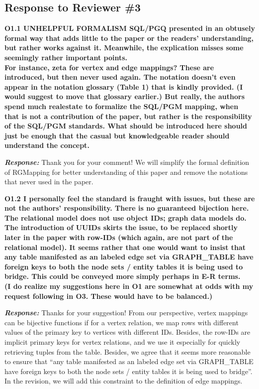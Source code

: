 \subsection{Response to Reviewer \#3}

\textbf{
O1.1 UNHELPFUL FORMALISM
SQL/PGQ presented in an obtusely formal way that adds little to the paper or the readers' understanding, but rather works against it. 
Meanwhile, the explication misses some seemingly rather important points. \\
For instance, zeta for vertex and edge mappings? These are introduced, but then never used again. The notation doesn't even appear in the notation glossary (Table 1) that is kindly provided. (I would suggest to move that glossary earlier.) But really, the authors spend much realestate to formalize the SQL/PGM mapping, when that is not a contribution of the paper, but rather is the responsibility of the SQL/PGM standards. What should be introduced here should just be enough that the casual but knowledgeable reader should understand the concept.}

\textbf{\textit{Response: }}
Thank you for your comment! We will simplify the formal definition of RGMapping for better understanding of this paper and remove the notations that never used in the paper.


\textbf{
O1.2 I personally feel the standard is fraught with issues, but these are not the authors' responsibility. There is no guaranteed bijection here. The relational model does not use object IDs; graph data models do. The introduction of UUIDs skirts the issue, to be replaced shortly later in the paper with row-IDs (which again, are not part of the relational model). It seems rather that one would want to insist that any table manifested as an labeled edge set via GRAPH\_TABLE have foreign keys to both the node sets / entity tables it is being used to bridge. This could be conveyed more simply perhaps in E-R terms. \\
(I do realize my suggestions here in O1 are somewhat at odds with my request following in O3. These would have to be balanced.)}

\textbf{\textit{Response: }}
Thanks for your suggestion! From our perspective, vertex mappings can be bijective functions if for a vertex relation, we map rows with different values of the primary key to vertices with different IDs. Besides, the row-IDs are implicit primary keys for vertex relations, and we use it especially for quickly retrieving tuples from the table. Besides, we agree that it seems more reasonable to ensure that ``any table manifested as an labeled edge set via GRAPH\_TABLE have foreign keys to both the node sets / entity tables it is being used to bridge''. In the revision, we will add this constraint to the definition of edge mappings.


